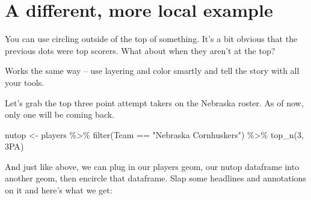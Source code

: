 \documentclass[
]{book}
\newenvironment{Shaded}{\begin{snugshade}}{\end{snugshade}}
\newcommand{\AttributeTok}[1]{\textcolor[rgb]{0.77,0.63,0.00}{#1}}
\newcommand{\DecValTok}[1]{\textcolor[rgb]{0.00,0.00,0.81}{#1}}
\newcommand{\FunctionTok}[1]{\textcolor[rgb]{0.00,0.00,0.00}{#1}}
\newcommand{\NormalTok}[1]{#1}
\newcommand{\OtherTok}[1]{\textcolor[rgb]{0.56,0.35,0.01}{#1}}
\newcommand{\SpecialCharTok}[1]{\textcolor[rgb]{0.00,0.00,0.00}{#1}}
\newcommand{\StringTok}[1]{\textcolor[rgb]{0.31,0.60,0.02}{#1}}
\begin{document}
\hypertarget{a-different-more-local-example}{%
\section{A different, more local example}\label{a-different-more-local-example}}

You can use circling outside of the top of something. It's a bit obvious that the previous dots were top scorers. What about when they aren't at the top?

Works the same way -- use layering and color smartly and tell the story with all your tools.

Let's grab the top three point attempt takers on the Nebraska roster. As of now, only one will be coming back.

\begin{Shaded}
\begin{Highlighting}[]
\NormalTok{nutop }\OtherTok{\textless{}{-}}\NormalTok{ players }\SpecialCharTok{\%\textgreater{}\%} \FunctionTok{filter}\NormalTok{(Team }\SpecialCharTok{==} \StringTok{"Nebraska Cornhuskers"}\NormalTok{) }\SpecialCharTok{\%\textgreater{}\%} \FunctionTok{top\_n}\NormalTok{(}\DecValTok{3}\NormalTok{, }\StringTok{\textasciigrave{}}\AttributeTok{3PA}\StringTok{\textasciigrave{}}\NormalTok{)}
\end{Highlighting}
\end{Shaded}

And just like above, we can plug in our players geom, our nutop dataframe into another geom, then encircle that dataframe. Slap some headlines and annotations on it and here's what we get:
\end{document}
